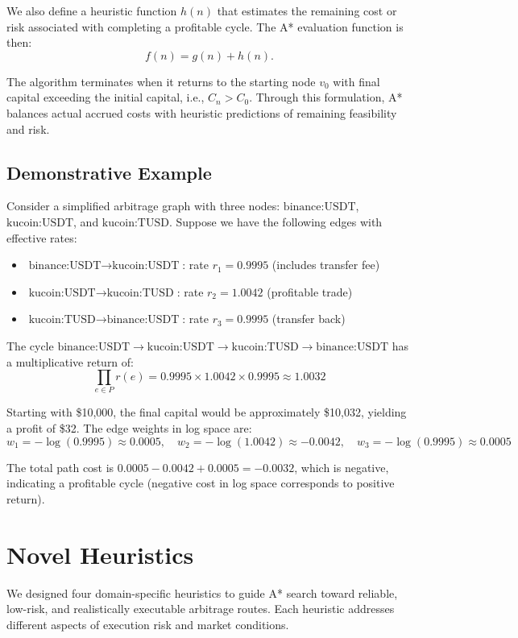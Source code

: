 \documentclass[11pt]{article}
\begin{document}
We also define a heuristic function $h(n)$ that estimates the remaining cost or risk associated with completing a profitable cycle. The A* evaluation function is then:
\[
f(n) = g(n) + h(n).
\]

The algorithm terminates when it returns to the starting node $v_0$ with final capital exceeding the initial capital, i.e., $C_n > C_0$. Through this formulation, A* balances actual accrued costs with heuristic predictions of remaining feasibility and risk.

\subsection{Demonstrative Example}

Consider a simplified arbitrage graph with three nodes: $\text{binance:USDT}$, $\text{kucoin:USDT}$, and $\text{kucoin:TUSD}$. Suppose we have the following edges with effective rates:

\begin{itemize}
\item $\text{binance:USDT} \to \text{kucoin:USDT}$: rate $r_1 = 0.9995$ (includes transfer fee)
\item $\text{kucoin:USDT} \to \text{kucoin:TUSD}$: rate $r_2 = 1.0042$ (profitable trade)
\item $\text{kucoin:TUSD} \to \text{binance:USDT}$: rate $r_3 = 0.9995$ (transfer back)
\end{itemize}

The cycle $\text{binance:USDT} \to \text{kucoin:USDT} \to \text{kucoin:TUSD} \to \text{binance:USDT}$ has a multiplicative return of:
\[
\prod_{e\in P} r(e) = 0.9995 \times 1.0042 \times 0.9995 \approx 1.0032
\]

Starting with \$10,000, the final capital would be approximately \$10,032, yielding a profit of \$32. The edge weights in log space are:
\[
w_1 = -\log(0.9995) \approx 0.0005, \quad
w_2 = -\log(1.0042) \approx -0.0042, \quad
w_3 = -\log(0.9995) \approx 0.0005
\]

The total path cost is $0.0005 - 0.0042 + 0.0005 = -0.0032$, which is negative, indicating a profitable cycle (negative cost in log space corresponds to positive return).

\section{Novel Heuristics}

We designed four domain-specific heuristics to guide A* search toward reliable, low-risk, and realistically executable arbitrage routes. Each heuristic addresses different aspects of execution risk and market conditions.
\end{document}
